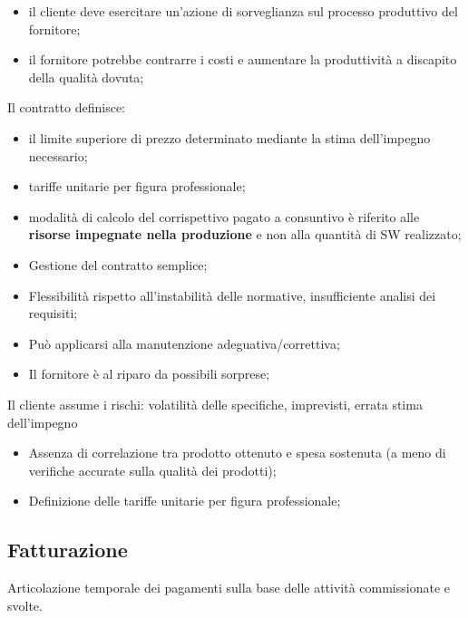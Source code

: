 \documentclass{article}
\begin{document}
\begin{description}
\begin{critical}[Criticità]
\begin{itemize}
                    \begin{itemize}
                        \item il cliente deve esercitare un'azione di sorveglianza sul processo produttivo del fornitore;
                        \item il fornitore potrebbe contrarre i costi e aumentare la produttività a discapito della qualità dovuta;
                    \end{itemize}
            \end{itemize}
        \end{critical}
    \item[Risorse Utilizzate] Il contratto definisce:
        \begin{itemize}
            \item il limite superiore di prezzo determinato mediante la stima dell'impegno necessario;
            \item tariffe unitarie per figura professionale;
            \item modalità di calcolo del corrispettivo pagato a consuntivo è riferito alle \textbf{risorse impegnate nella produzione} e non alla quantità di SW realizzato;
        \end{itemize}
        \begin{note}[Vantaggi]
            \begin{itemize}
                \item Gestione del contratto semplice;
                \item Flessibilità rispetto all'instabilità delle normative, insufficiente analisi dei requisiti;
                \item Può applicarsi alla manutenzione adeguativa/correttiva;
                \item Il fornitore è al riparo da possibili sorprese;
            \end{itemize}
        \end{note}
        \begin{warning}[Svantaggi]
            Il cliente assume i rischi: volatilità delle specifiche, imprevisti, errata stima dell'impegno
        \end{warning}
        \begin{critical}[Criticità]
            \begin{itemize}
                \item Assenza di correlazione tra prodotto ottenuto e spesa sostenuta (a meno di verifiche accurate sulla qualità dei prodotti);
                \item Definizione delle tariffe unitarie per figura professionale;
            \end{itemize}
        \end{critical}
\end{description}
%
\subsection{Fatturazione}\label{sub:fatturazione} %
Articolazione temporale dei pagamenti sulla base delle attività commissionate e svolte.
\end{document}
